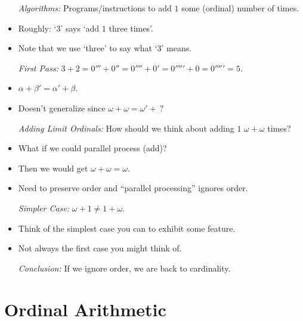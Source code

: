 \documentclass[a4paper, 11pt]{article} %
\begin{document}
\begin{itemize}
  \item[\it Algorithms:] Programs/instructions to add $1$ some (ordinal) number of times. 
    \item Roughly: `$3$' says `add $1$ three times'.
    \item Note that we use `three' to say what `$3$' means.
  \item[\it First Pass:] $3 + 2 = 0''' + 0'' = 0'''' + 0' = 0''''' + 0 = 0''''' = 5$.
    \item $\alpha + \beta' = \alpha' + \beta$.
    \item Doesn't generalize since $\omega + \omega = \omega' +\ ?$ 
  \item[\it Adding Limit Ordinals:] How should we think about adding $1$ $\omega + \omega$ times?
    \item What if we could parallel process (add)?
    \item Then we would get $\omega + \omega = \omega$.
    \item Need to preserve order and ``parallel processing'' ignores order.
  \item[\it Simpler Case:] $\omega + 1 \neq 1 + \omega$.
    \item Think of the simplest case you can to exhibit some feature.
    \item Not always the first case you might think of.
  \item[\it Conclusion:] If we ignore order, we are back to cardinality.
\end{itemize}





\section*{Ordinal Arithmetic}
\end{document}
